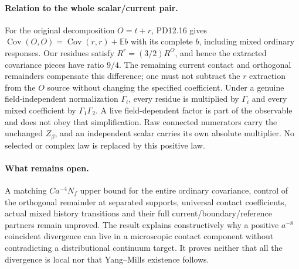 \documentclass[11pt]{article}
\newcommand{\E}{\mathbb E}
\newcommand{\Cov}{\operatorname{Cov}}
\begin{document}
\paragraph{Relation to the whole scalar/current pair.}
For the original decomposition $O=t+r$, PD12.16 gives
$\Cov(O,O)=\Cov(r,r)+\E b$ with its complete $b$, including mixed ordinary responses.
Our residues satisfy $R^r=(3/2)R^O$, and hence the extracted covariance pieces have ratio
$9/4$. The remaining current contact and orthogonal remainders compensate this difference;
one must not subtract the $r$ extraction from the $O$ source without changing the specified
coefficient. Under a genuine field-independent normalization $\Gamma_i$, every residue
is multiplied by $\Gamma_i$ and every mixed coefficient by $\Gamma_1\Gamma_2$.
A live field-dependent factor is part of the observable and does not obey that simplification.
Raw connected numerators carry the unchanged $Z_\beta$, and an independent scalar carries
its own absolute multiplier. No selected or complex law is replaced by this positive law.

\paragraph{What remains open.}
A matching $Ca^{-4}N_f$ upper bound for the entire ordinary covariance, control of the
orthogonal remainder at separated supports, universal contact coefficients, actual mixed
history transitions and their full current/boundary/reference partners remain unproved.
The result explains constructively why a positive $a^{-8}$ coincident divergence can live
in a microscopic contact component without contradicting a distributional continuum target.
It proves neither that all the divergence is local nor that Yang--Mills existence follows.
\end{document}
